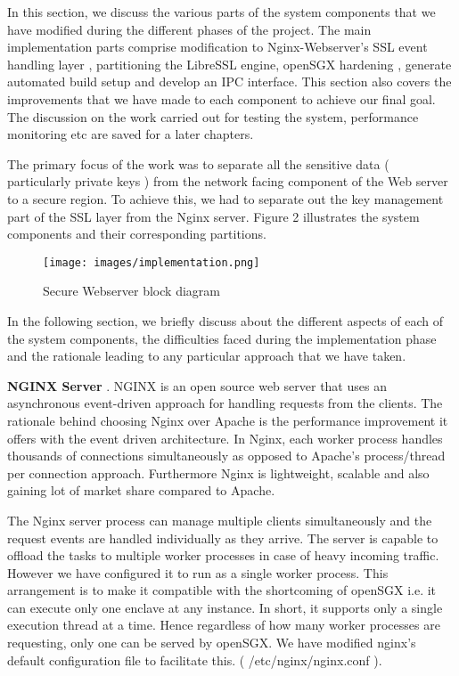 \documentclass[../main.tex]{subfiles}
\begin{document}
In this section,  we discuss the various parts of the system components that we have modified during the different phases of the project. The main implementation parts comprise modification to Nginx-Webserver’s SSL event handling layer , partitioning the LibreSSL engine, openSGX hardening , generate automated build setup and develop an IPC interface.  This  section also covers the improvements that we have made to  each component to achieve our final goal. The discussion on the work carried out  for testing the system, performance monitoring etc are  saved for a later chapters.

The primary focus of the work was to separate all the sensitive data ( particularly  private keys ) from the network facing component of the Web server to a secure region. To achieve this, we had to separate out the key management part of the SSL layer from the Nginx server. 
Figure 2 illustrates the system components and their corresponding partitions. 

\begin{figure}[H]
  \centering
  \texttt{[image: images/implementation.png]}
  \caption{Secure Webserver block diagram }
  \label{fig:implementation-overview}
\end{figure}

In the following section,  we briefly discuss about the different aspects of each of the system components, the difficulties faced during the implementation phase and the rationale leading to any particular approach that we have taken. 

\item \textbf{NGINX Server }.
NGINX is an open source web server that uses an asynchronous event-driven approach for handling requests from the clients. The rationale behind choosing Nginx over Apache is the performance improvement it offers with the event driven architecture. In Nginx, each worker process handles thousands of connections simultaneously as opposed to Apache’s process/thread per connection approach. Furthermore Nginx is lightweight, scalable and also gaining lot of market share compared to Apache.

The Nginx server process can manage multiple clients simultaneously and the request events are handled individually as they arrive. The server is capable to offload  the tasks to multiple worker processes in case of heavy incoming traffic. However we have configured it to run as a single worker process. This arrangement is to make it compatible with the shortcoming of openSGX i.e. it can execute only one enclave at any instance. In short, it supports only a  single execution thread at a time. Hence regardless of how many worker processes are requesting, only one can be served by openSGX.  We have modified nginx’s default configuration file to facilitate this.  (  /etc/nginx/nginx.conf ).  
\end{document}
